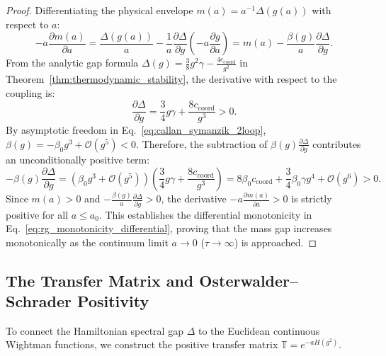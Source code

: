 \documentclass[11pt,reqno]{article}
\begin{document}
\begin{proof}
Differentiating the physical envelope $m(a) = a^{-1} \Delta(g(a))$ with respect to $a$:
\begin{equation}
    -a \frac{\partial m(a)}{\partial a} = \frac{\Delta(g(a))}{a} - \frac{1}{a} \frac{\partial \Delta}{\partial g} \left( -a \frac{\partial g}{\partial a} \right) = m(a) - \frac{\beta(g)}{a} \frac{\partial \Delta}{\partial g}.
\end{equation}
From the analytic gap formula $\Delta(g) = \frac{3}{8} g^2 \gamma - \frac{4 c_{\mathrm{coord}}}{g^2}$ in Theorem~\ref{thm:thermodynamic_stability}, the derivative with respect to the coupling is:
\begin{equation}
    \frac{\partial \Delta}{\partial g} = \frac{3}{4} g \gamma + \frac{8 c_{\mathrm{coord}}}{g^3} > 0.
\end{equation}
By asymptotic freedom in Eq.~\eqref{eq:callan_symanzik_2loop}, $\beta(g) = -\beta_0 g^3 + \mathcal{O}(g^5) < 0$.
Therefore, the subtraction of $\beta(g) \frac{\partial \Delta}{\partial g}$ contributes an unconditionally positive term:
\begin{equation}
    -\beta(g) \frac{\partial \Delta}{\partial g} = \left( \beta_0 g^3 + \mathcal{O}(g^5) \right) \left( \frac{3}{4} g \gamma + \frac{8 c_{\mathrm{coord}}}{g^3} \right) = 8 \beta_0 c_{\mathrm{coord}} + \frac{3}{4} \beta_0 \gamma g^4 + \mathcal{O}(g^6) > 0.
\end{equation}
Since $m(a) > 0$ and $-\frac{\beta(g)}{a} \frac{\partial \Delta}{\partial g} > 0$, the derivative $-a \frac{\partial m(a)}{\partial a} > 0$ is strictly positive for all $a \le a_0$.
This establishes the differential monotonicity in Eq.~\eqref{eq:rg_monotonicity_differential}, proving that the mass gap increases monotonically as the continuum limit $a \to 0$ ($\tau \to \infty$) is approached.
\end{proof}

\subsection{The Transfer Matrix and Osterwalder--Schrader Positivity}
\label{subsec:transfer_matrix_os_positivity}
To connect the Hamiltonian spectral gap $\Delta$ to the Euclidean continuous Wightman functions, we construct the positive transfer matrix $\mathbb{T} = e^{-a H(g^2)}$.
\end{document}
